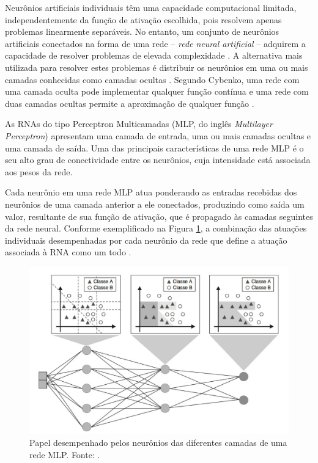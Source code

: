 
Neurônios artificiais individuais têm uma capacidade computacional limitada, independentemente da função de ativação escolhida, pois resolvem apenas problemas linearmente separáveis. No entanto, um conjunto de neurônios artificiais conectados na forma de uma rede -- \emph{rede neural artificial} -- adquirem a capacidade de resolver problemas de elevada complexidade \cite{ref:teresa}. A alternativa mais utilizada para resolver estes problemas é distribuir os neurônios em uma ou mais camadas conhecidas como  camadas ocultas \cite{ref:faceli}. Segundo Cybenko, uma rede com uma camada oculta pode implementar qualquer função contínua e uma rede com duas camadas ocultas permite a aproximação de qualquer função \cite{ref:cybenko}.


As RNAs do tipo Perceptron Multicamadas (MLP, do inglês \emph{Multilayer Perceptron}) apresentam uma camada de entrada, uma ou mais camadas ocultas e uma camada de saída. Uma das principais características de uma rede MLP é o seu alto grau de conectividade entre os neurônios, cuja intensidade está associada aos pesos da rede.

Cada neurônio em uma rede MLP atua ponderando as entradas recebidas dos neurônios de uma camada anterior a ele conectados, produzindo como saída um valor, resultante de sua função de ativação, que é propagado às camadas seguintes da rede neural. Conforme exemplificado na Figura \ref{img:rede-mlp}, a combinação das atuações individuais desempenhadas por cada neurônio da rede que define a atuação associada à RNA como um todo \cite{ref:teresa,ref:faceli,ref:haykin}.


\begin{figure}[!ht]
	\centering
	\includegraphics[width=1\textwidth]{./img/rede-mlp}
	\caption{Papel desempenhado pelos neurônios das diferentes camadas de uma rede MLP. Fonte: \cite{ref:faceli}.}
	\label{img:rede-mlp}
\end{figure}


